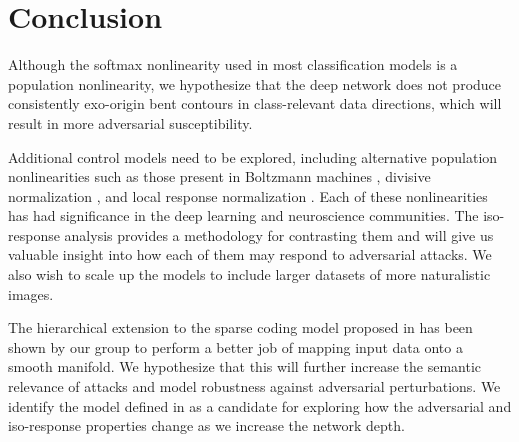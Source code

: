 




\section{Conclusion}
Although the softmax nonlinearity used in most classification models is a population nonlinearity, we hypothesize that the deep network does not produce consistently exo-origin bent contours in class-relevant data directions, which will result in more adversarial susceptibility.

Additional control models need to be explored, including alternative population nonlinearities such as those present in Boltzmann machines \parencite{salakhutdinov2009deep}, divisive normalization \parencite{balle2016end}, and local response normalization \parencite{krizhevsky2012imagenet}. Each of these nonlinearities has had significance in the deep learning and neuroscience communities. The iso-response analysis provides a methodology for contrasting them and will give us valuable insight into how each of them may respond to adversarial attacks. We also wish to scale up the models to include larger datasets of more naturalistic images. 

The hierarchical extension to the sparse coding model proposed in \parencite{chen2018sparse} has been shown by our group to perform a better job of mapping input data onto a smooth manifold. We hypothesize that this will further increase the semantic relevance of attacks and model robustness against adversarial perturbations. We identify the model defined in \parencite{chen2018sparse} as a candidate for exploring how the adversarial and iso-response properties change as we increase the network depth.

